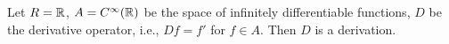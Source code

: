 \begin{example}
  Let
    $R = \mathbb{R}$,
    $A = C^\infty(\mathbb{R})$ be the space of infinitely differentiable functions,
    $D$ be the derivative operator, i.e., $D f = f'$ for $f \in A$.
  Then $D$ is a derivation.
\end{example}
